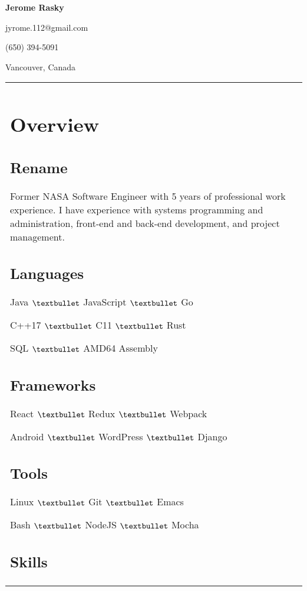 \documentclass[letterpaper]{article}
\newlength{\leftcol}
\newlength{\rightcol}
\begin{document}
\bodyfont
\large
{}

{\fontsize{32pt}{32pt}\bfseries\headingfont Jerome Rasky}

\vspace*{.5\baselineskip}

jyrome.112@gmail.com

(650) 394-5091

Vancouver, Canada

\begin{tabularx}{\textwidth}{@{}p{\leftcol} p{\rightcol}}
\raggedright
\vspace*{1pt}
\section*{Overview}
\subsection*{Rename}

Former NASA Software Engineer with 5 years of professional work experience. I
have experience with systems programming and administration, front-end and
back-end development, and project management.

\subsection*{Languages}

Java $\textbullet$ JavaScript $\textbullet$ Go

C++17 $\textbullet$ C11 $\textbullet$ Rust

SQL $\textbullet$ AMD64 Assembly

\subsection*{Frameworks}

React $\textbullet$ Redux $\textbullet$ Webpack

Android $\textbullet$ WordPress $\textbullet$ Django

\subsection*{Tools}

Linux $\textbullet$ Git $\textbullet$ Emacs

Bash $\textbullet$ NodeJS $\textbullet$ Mocha

\subsection*{Skills}


\end{tabularx}
\end{document}
